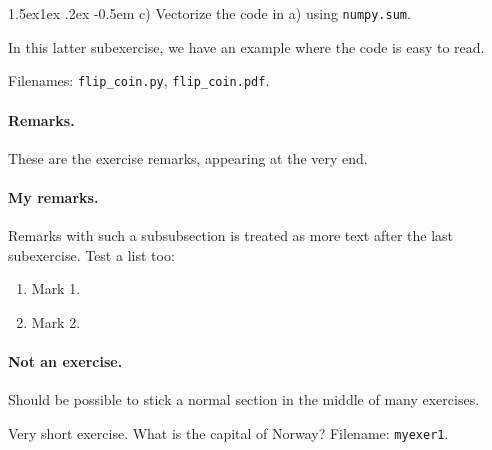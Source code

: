 \documentclass[%
oneside,                 %
final,                   %
10pt]{article}
\makeatletter
\newenvironment{doconceexercise}{}{}
\newcounter{doconceexercisecounter}
\newcommand\subex{\@startsection{paragraph}{4}{\z@}%
                  {1.5ex\@plus1ex \@minus.2ex}%
                  {-0.5em}%
                  {\normalfont\normalsize\bfseries}}
\theoremstyle{definition}
\makeatother
\begin{document}
\begin{enumerate}
\begin{doconceexercise}

\subex{c)}
Vectorize the code in a) using \texttt{numpy.sum}.


In this latter subexercise, we have an
example where the code is easy to read.


\noindent Filenames: \Verb!flip_coin.py!, \Verb!flip_coin.pdf!.


\paragraph{Remarks.}
These are the exercise remarks, appearing at the very end.


\end{doconceexercise}

\paragraph{My remarks.}
Remarks with such a subsubsection is treated as more text
after the last subexercise. Test a list too:

\begin{enumerate}
\item Mark 1.

\item Mark 2.
\end{enumerate}

\noindent
\paragraph{Not an exercise.}
Should be possible to stick a normal section in the middle of many
exercises.

\begin{doconceexercise}

                             
\label{my:exer1}

Very short exercise. What is the capital
of Norway?
\noindent Filename: \texttt{myexer1}.


\end{doconceexercise}
\end{enumerate}
\end{document}
